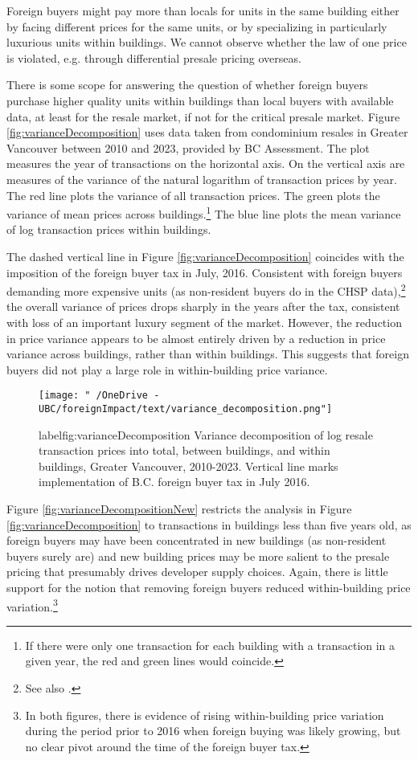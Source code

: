 \documentclass[12pt]{article}
\begin{document}
Foreign buyers might pay more than locals for units in the same building either
by facing different prices for the same units, or by specializing in
particularly luxurious units within buildings. We cannot observe whether the
law of one price is violated, e.g.  through differential presale pricing
overseas.

There is some scope for answering the question of whether foreign buyers
purchase higher quality units within buildings than local buyers with available
data, at least for the resale market, if not for the critical presale market.
Figure \ref{fig:varianceDecomposition} uses data taken from condominium
resales in Greater Vancouver between 2010 and 2023, provided by BC Assessment.
The plot measures the year of transactions on the horizontal axis. On the
vertical axis are measures of the variance of the natural logarithm of
transaction prices by year. The red line plots the variance of all transaction
prices. The green plots the variance of mean prices across
buildings.\footnote{If there were only one transaction for each building with a
transaction in a given year, the red and green lines would coincide.} The blue
line plots the mean variance of log transaction prices within buildings. 

The dashed vertical line in Figure \ref{fig:varianceDecomposition} coincides
with the imposition of the foreign buyer tax in July, 2016. Consistent with
foreign buyers demanding more expensive units (as non-resident buyers do in the
CHSP data),\footnote{See also
\textcite{gellatlyNonresidentOwnershipResidential2017}.}  the overall variance
of prices drops sharply in the years after the tax, consistent with loss of an
important luxury segment of the market.  However, the reduction in price
variance appears to be almost entirely driven by a reduction in price variance
across buildings, rather than within buildings. This suggests that foreign
buyers did not play a large role in within-building price variance.

\begin{figure}
	\caption{label{fig:varianceDecomposition} Variance decomposition of log resale transaction prices into total, between buildings, and within buildings, Greater Vancouver, 2010-2023. Vertical line marks implementation of B.C. foreign buyer tax in July 2016.}
\texttt{[image: "~/OneDrive - UBC/foreignImpact/text/variance\_decomposition.png"]}
\end{figure}

Figure \ref{fig:varianceDecompositionNew} restricts the analysis in Figure
\ref{fig:varianceDecomposition} to transactions in buildings less than five
years old, as foreign buyers may have been concentrated in new buildings (as
non-resident buyers surely are) and new building prices may be more salient to
the presale pricing that presumably drives developer supply choices. Again,
there is little support for the notion that removing foreign buyers reduced
within-building price variation.\footnote{In both figures, there is evidence of
rising within-building price variation during the period prior to 2016 when
foreign buying was likely growing, but no clear pivot around the time of the
foreign buyer tax.}
\end{document}
